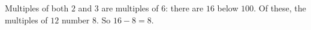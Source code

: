 Multiples of both $2$ and $3$ are multiples of $6$: there are $16$ below $100$. Of these, the multiples of $12$ number $8$. So $16-8=\boxed{8}$.
